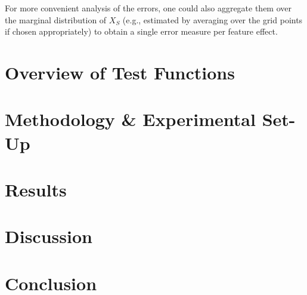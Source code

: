 \documentclass[runningheads]{llncs}
\begin{document}
\noindent For more convenient analysis of the errors, one could also
aggregate them over the marginal distribution of $X_S$ (e.g.,
estimated by averaging over the grid points if chosen appropriately)
to obtain a single error measure per feature effect.

\section{Overview of Test Functions}\label{sec:test-functions}

\section{Methodology \& Experimental Set-Up}\label{sec:methodology-set-up}

\section{Results}\label{sec:results}

\section{Discussion}\label{sec:discussion}

\section{Conclusion}\label{sec:conclusion}



\end{document}
